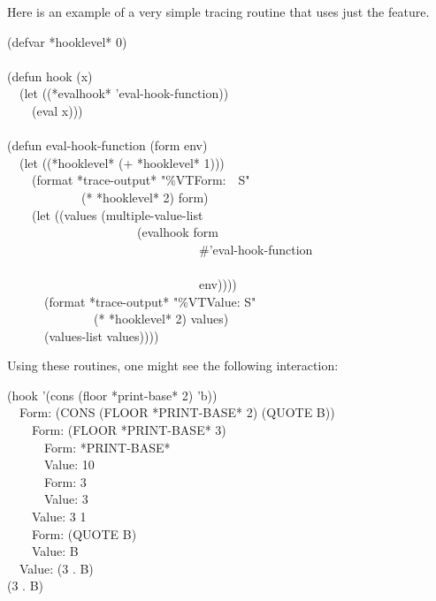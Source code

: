 \begin{defun}[Function]
Here is an example of a very simple tracing routine that uses just the
 feature.
\begin{lisp}
(defvar *hooklevel* 0) \\
 \\
(defun hook (x) \\
~~(let ((*evalhook* 'eval-hook-function)) \\
~~~~(eval x))) \\
 \\
(defun eval-hook-function (form  env) \\
~~(let ((*hooklevel* (+ *hooklevel* 1))) \\
~~~~(format *trace-output* "{\Xtilde}\%{\Xtilde}V{\Xatsign}TForm:~~{\Xtilde}S" \\
~~~~~~~~~~~~(* *hooklevel* 2) form) \\
~~~~(let ((values (multiple-value-list \\
~~~~~~~~~~~~~~~~~~~~~(evalhook form \\
~~~~~~~~~~~~~~~~~~~~~~~~~~~~~~~\#'eval-hook-function \\
~~~~~~~~~~~~~~~~~~~~~~~~~~~~~~~{\nil} \\
~~~~~~~~~~~~~~~~~~~~~~~~~~~~~~~env)))) \\
~~~~~~(format *trace-output* "{\Xtilde}\%{\Xtilde}V{\Xatsign}TValue:{\Xtilde}{\Xlbrace} {\Xtilde}S{\Xtilde}{\Xrbrace}" \\
~~~~~~~~~~~~~~(* *hooklevel* 2) values) \\
~~~~~~(values-list values))))
\end{lisp}
Using these routines, one might see the following interaction:
\begin{lisp}
(hook '(cons (floor *print-base* 2) 'b)) \\
~~Form:  (CONS (FLOOR *PRINT-BASE* 2) (QUOTE B)) \\
~~~~Form:  (FLOOR *PRINT-BASE* 3) \\
~~~~~~Form:  *PRINT-BASE* \\
~~~~~~Value: 10 \\
~~~~~~Form:  3 \\
~~~~~~Value: 3 \\
~~~~Value: 3 1 \\
~~~~Form:  (QUOTE B) \\
~~~~Value: B \\
~~Value: (3 . B) \\
(3 . B)
\end{lisp}


\end{defun}

